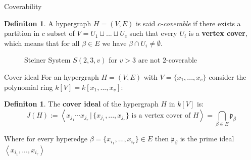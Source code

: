 \documentclass[dvipsnames]{beamer}
\theoremstyle{plain}
\theoremstyle{remark}
\theoremstyle{definition}
\newtheorem{deff}[teo]{Definiton}
\newcommand{\p}{\mathfrak{p}}
\begin{document}
\begin{frame}{Coverability}


\begin{deff} \label{def:cover}
A hypergraph $ H = (V,E) $ is said \textit{$ c $-coverable} if there exists a partition in $ c $ subset of $ V = U_1 \sqcup ... \sqcup U_c $ such that every $ U_i $ is a \textbf{vertex cover}, which means  that for all $ \beta \in E $ we have $ \beta \cap U_i \neq \emptyset $.
\end{deff}
\begin{figure}

\caption{Steiner System $S(2,3,v)$ for $ v>3 $ are not $ 2 $-coverable}
\end{figure}
\end{frame}

%

\begin{frame}{Cover ideal}
For an hypergraph $ H = (V,E) $ with $ V = \{ x_1, ... ,x_v\} $ consider the polynomial ring $ k[V] = k[x_1, ... ,x_v] $:
\begin{deff}
The \textbf{cover ideal} of the hypergraph $ H $ in $ k[V] $ is:
\begin{equation*}
J(H) := \left\langle x_{j_1} \cdots x_{j_r} \,|\, \{ x_{j_1} , ... , x_{j_r}\} \text{ is a vertex cover of } H \right\rangle  = \bigcap_{\beta \in E} \p_\beta
\end{equation*}
\end{deff}
Where for every hyperedge $ \beta = \{ x_{i_1} , ... , x_{i_r}\} \in E  $ then $ \p_\beta $ is the prime ideal $ \left\langle  x_{i_1} , ... , x_{i_r} \right\rangle  $
\end{frame}
\end{document}
